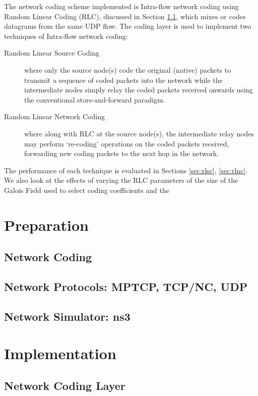 \documentclass[12pt,a4paper,twoside,openright]{report}
\begin{document}
The network coding scheme implemented is Intra-flow network coding using Random Linear Coding (RLC), discussed in Section \ref{sec:nctheory}, which mixes or codes datagrams from the same UDP flow. The coding layer is used to implement two techniques of Intra-flow network coding:
\begin{description}
 	\item[Random Linear Source Coding] where only the source node(s) code the original (native) packets to transmit a sequence of coded packets into the network while the intermediate nodes simply relay the coded packets received onwards using the conventional store-and-forward paradigm.
 	\item[Random Linear Network Coding] where along with RLC at the source node(s), the intermediate relay nodes may perform `re-coding' operations on the coded packets received, forwarding new coding packets to the next hop in the network.
 \end{description}
 The performance of each technique is evaluated in Sections \ref{sec:rlsc}, \ref{sec:rlnc}. We also look at the effects of varying the RLC parameters of the size of the Galois Field used to select coding coefficients and the 


\chapter{Preparation} \label{ch:prep}

\section{Network Coding} \label{sec:nctheory}
\section{Network Protocols: MPTCP, TCP/NC, UDP}
\section{Network Simulator: ns3}

\chapter{Implementation} \label{ch:imp}

\section{Network Coding Layer} \label{sec:nclayer}
\end{document}
